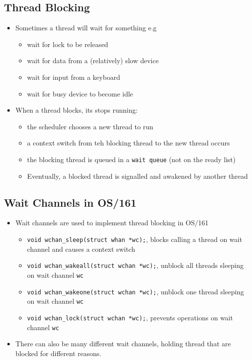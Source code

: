 \documentclass[twoside]{article}
\begin{document}
\subsection{Thread Blocking}
\begin{itemize}
\item Sometimes a thread will wait for something e.g
\begin{itemize}
\item wait for lock to be released
\item wait for data from a (relatively) slow device
\item wait for input from a keyboard
\item wait for busy device to become idle
\end{itemize}
\item When a thread blocks, its stops running:
\begin{itemize}
\item the scheduler chooses a new thread to run 
\item a context switch from teh blocking thread to the new thread occurs
\item the blocking thread is queued in a \verb|wait queue| (not on the ready list)
\item Eventually, a blocked thread is signalled and awakened by another thread
\end{itemize}
\end{itemize}

\subsection{Wait Channels in OS/161}
\begin{itemize}
\item  Wait channels are used to implement thread blocking in OS/161
\begin{itemize}
\item \verb|void wchan_sleep(struct whan *wc);|, blocks calling a thread on wait channel and causes a context switch 
\item \verb|void wchan_wakeall(struct wchan *wc);|, unblock all threads sleeping on wait channel \verb|wc|
\item \verb|void wchan_wakeone(struct wchan *wc);|, unblock one thread sleeping on wait channel \verb|wc|
\item \verb|void wchan_lock(struct wchan *wc);|, prevents operations on wait channel \verb|wc|
\end{itemize}
\item There can also be many different wait channels, holding thread that are blocked for different reasons. 
\end{itemize}
\end{document}
